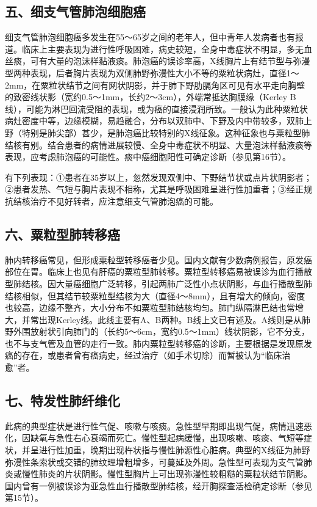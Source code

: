 \subsection{五、细支气管肺泡细胞癌}

细支气管肺泡细胞癌多发生在55～65岁之间的老年人，但中青年人发病者也有报道。临床上主要表现为进行性呼吸困难，病史较短，全身中毒症状不明显，多无血丝痰，可有大量的泡沫样黏液痰。肺泡癌的误诊率高，X线胸片上有结节型与弥漫型两种表现，后者胸片表现为双侧肺野弥漫性大小不等的粟粒状病灶，直径1～2mm，在粟粒状结节之间有网状阴影，并于肺下野肋膈角区可见有水平走向胸壁的致密线状影（宽约0.5～1mm，长约2～3cm），外端常抵达胸膜缘（Kerley
B线），可能为淋巴回流受阻的表现，或为癌的直接浸润所致。一般认为此种粟粒状病灶密度中等，边缘模糊，易趋融合，分布以双肺中、下野及内中带较多，双肺上野（特别是肺尖部）甚少，是肺泡癌比较特别的X线征象。这种征象也与粟粒型肺结核有别。结合患者的病情进展较慢、全身中毒症状不明显、大量泡沫样黏液痰等表现，应考虑肺泡癌的可能性。痰中癌细胞阳性可确定诊断（参见第16节）。

有下列表现：①患者在35岁以上，忽然发现双侧中、下野结节状或点片状阴影者；②患者发热、气短与胸片表现不相称，尤其是呼吸困难呈进行性加重者；③经正规抗结核治疗不见好转者，应注意细支气管肺泡癌的可能。

\subsection{六、粟粒型肺转移癌}

肺内转移癌常见，但形成粟粒型转移癌者少见。国内文献有少数病例报告，原发癌部位在胃。临床上也见有肝癌的粟粒型肺转移。粟粒型转移癌易被误诊为血行播散型肺结核。因大量癌细胞广泛转移，引起两肺广泛性小点状阴影，与血行播散型肺结核相似，但其结节较粟粒型结核为大（直径4～8mm），且有增大的倾向，密度也较高，边缘不整齐，大小分布不如粟粒型肺结核均匀。肺门纵隔淋巴结也常增大，并常出现Kerley线。此线主要有A、B两种。B线上文已有述及。A线则是从肺野外围放射状引向肺门的（长约5～6cm，宽约0.5～1mm）线状阴影，它不分支，也不与支气管及血管的走行一致。肺内粟粒型转移癌的诊断，主要根据是发现原发癌的存在，或患者曾有癌病史，经过治疗（如手术切除）而暂被认为“临床治愈”者。

\subsection{七、特发性肺纤维化}

此病的典型症状是进行性气促、咳嗽与咳痰。急性型早期即出现气促，病情迅速恶化，因缺氧与急性右心衰竭而死亡。慢性型起病缓慢，出现咳嗽、咳痰、气短等症状，并呈进行性加重，晚期出现杵状指与慢性肺源性心脏病。典型的X线征为肺野弥漫性条索状或交错的肺纹理增粗增多，可蔓延及外周。急性型可表现为支气管肺炎或慢性肺炎的片状阴影。慢性型胸片上可出现弥漫性较粗糙的粟粒状结节阴影。国内曾有一例被误诊为亚急性血行播散型肺结核，经开胸探查活检确定诊断（参见第15节）。

